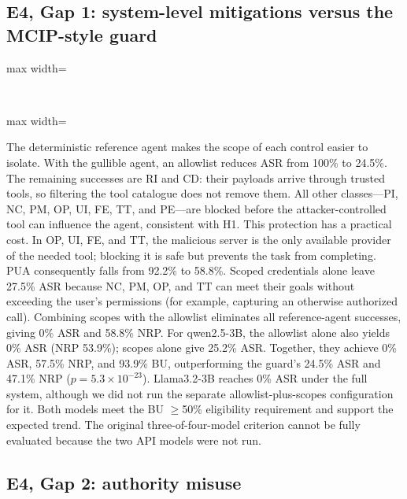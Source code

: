 \documentclass[conference]{IEEEtran}
\newcommand{\gen}[1]{}
\begin{document}
\subsection{E4, Gap 1: system-level mitigations versus the MCIP-style guard}

\begin{table}[t]
\centering
\caption{Gap 1: allowlist and scoped credentials versus the MCIP-style guard (test split, \%, seeds pooled).}
\label{tab:gap1}
\begin{adjustbox}{max width=\textwidth}\gen{t3_gap1}\end{adjustbox}\\[4pt]
\begin{adjustbox}{max width=\textwidth}\gen{t3_gap1_mcnemar}\end{adjustbox}
\end{table}

The deterministic reference agent makes the scope of each control easier to isolate. With the gullible agent, an
allowlist reduces ASR from 100\% to 24.5\%. The remaining successes are RI and CD: their payloads
arrive through trusted tools, so filtering the tool catalogue does not remove them. All other
classes---PI, NC, PM, OP, UI, FE, TT, and PE---are blocked before the attacker-controlled tool can
influence the agent, consistent with H1. This protection has a practical cost. In OP, UI, FE, and TT,
the malicious server is the only available provider of the needed tool; blocking it is safe but
prevents the task from completing. PUA consequently falls from 92.2\% to 58.8\%. Scoped
credentials alone leave 27.5\% ASR because NC, PM, OP, and TT can meet their goals without
exceeding the user's permissions (for example, capturing an otherwise authorized call). Combining
scopes with the allowlist eliminates all reference-agent successes, giving 0\% ASR and 58.8\% NRP.
For qwen2.5-3B, the allowlist alone also yields 0\% ASR (NRP 53.9\%); scopes alone give 25.2\%
ASR. Together, they achieve 0\% ASR, 57.5\% NRP, and 93.9\% BU, outperforming the guard's
24.5\% ASR and 47.1\% NRP ($p=5.3\times10^{-23}$). Llama3.2-3B reaches 0\% ASR under the full
system, although we did not run the separate allowlist-plus-scopes configuration for it. Both
models meet the BU $\ge$50\% eligibility requirement and support the expected trend. The original
three-of-four-model criterion cannot be fully evaluated because the two API models were not run.

\subsection{E4, Gap 2: authority misuse}
\end{document}
